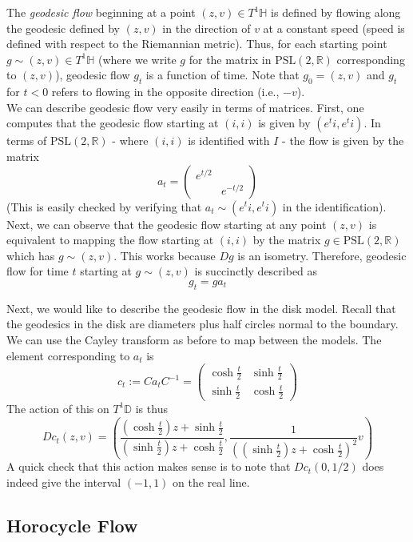 \documentclass[]{article}
\begin{document}
The \textit{geodesic flow} beginning at a point $(z, v) \in T^1\mathbb{H}$ is defined by flowing along the geodesic defined by $(z, v)$ in the direction of $v$ at a constant speed (speed is defined with respect to the Riemannian metric).
Thus, for each starting point $g \sim (z, v) \in T^1\mathbb{H}$ (where we write $g$ for the matrix in $\text{PSL}(2, \mathbb{R})$ corresponding to $(z, v)$), geodesic flow $g_t$ is a function of time.
Note that $g_0 = (z, v)$ and $g_t$ for $t < 0$ refers to flowing in the opposite direction (i.e., $-v$).
\\

We can describe geodesic flow very easily in terms of matrices.
First, one computes that the geodesic flow starting at $(i, i)$ is given by $(e^ti, e^ti)$.
In terms of $\text{PSL}(2, \mathbb{R})$ - where $(i, i)$ is identified with $I$ - the flow is given by the matrix
$$
a_t =
\begin{pmatrix}
e^{t/2} & ~ \\
~ & e^{-t/2}
\end{pmatrix}
$$
(This is easily checked by verifying that $a_t \sim (e^ti, e^ti)$ in the identification).
Next, we can observe that the geodesic flow starting at any point $(z, v)$ is equivalent to mapping the flow starting at $(i, i)$ by the matrix $g \in \text{PSL}(2, \mathbb{R})$ which has $g \sim (z, v)$.
This works because $Dg$ is an isometry.
Therefore, geodesic flow for time $t$ starting at $g \sim (z, v)$ is succinctly described as
$$
g_t = ga_t
$$

Next, we would like to describe the geodesic flow in the disk model.
Recall that the geodesics in the disk are diameters plus half circles normal to the boundary.
We can use the Cayley transform as before to map between the models.
The element corresponding to $a_t$ is
$$
c_t := Ca_tC^{-1} =
\begin{pmatrix}
\cosh\frac{t}{2} & \sinh\frac{t}{2} \\
\sinh\frac{t}{2} & \cosh\frac{t}{2}
\end{pmatrix}
$$
The action of this on $T^1\mathbb{D}$ is thus
$$
Dc_t(z, v) = \left( \frac{\left( \cosh\frac{t}{2} \right)z + \sinh\frac{t}{2}}{\left( \sinh\frac{t}{2} \right)z + \cosh\frac{t}{2}}, \frac{1}{\left( \left( \sinh\frac{t}{2} \right)z + \cosh\frac{t}{2} \right)^2}v \right)
$$
A quick check that this action makes sense is to note that $Dc_t(0, 1/2)$ does indeed give the interval $(-1, 1)$ on the real line.

\subsection*{Horocycle Flow}
\end{document}
